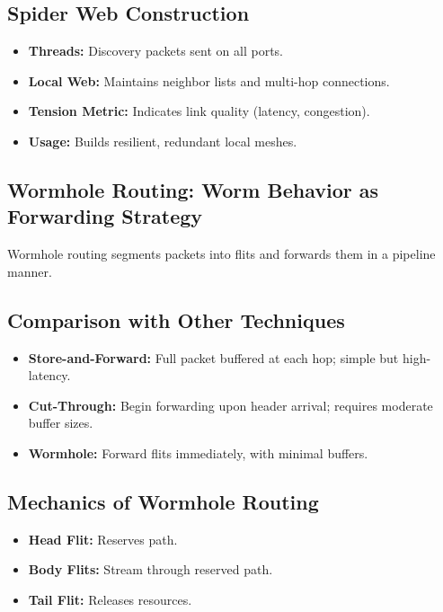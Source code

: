 \documentclass[../../../OAE-SPEC-MAIN.tex]{subfiles}
\begin{document}
\subsection{Spider Web Construction}

\begin{itemize}
\item \textbf{Threads:} Discovery packets sent on all ports.
\item \textbf{Local Web:} Maintains neighbor lists and multi-hop connections.
\item \textbf{Tension Metric:} Indicates link quality (latency, congestion).
\item \textbf{Usage:} Builds resilient, redundant local meshes.
\end{itemize}

\subsection{Wormhole Routing: Worm Behavior as Forwarding Strategy}

Wormhole routing segments packets into flits and forwards them in a pipeline manner.

\subsection{Comparison with Other Techniques}

\begin{itemize}
\item \textbf{Store-and-Forward:} Full packet buffered at each hop; simple but high-latency.
\item \textbf{Cut-Through:} Begin forwarding upon header arrival; requires moderate buffer sizes.
\item \textbf{Wormhole:} Forward flits immediately, with minimal buffers.
\end{itemize}

\subsection{Mechanics of Wormhole Routing}

\begin{itemize}
\item \textbf{Head Flit:} Reserves path.
\item \textbf{Body Flits:} Stream through reserved path.
\item \textbf{Tail Flit:} Releases resources.
\end{itemize}
\end{document}
